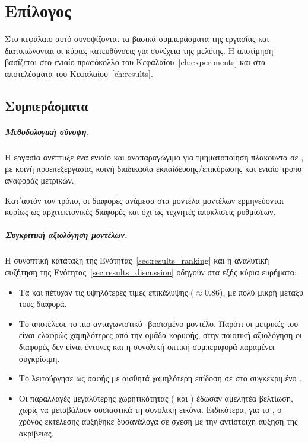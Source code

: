 \chapter{Επίλογος}
\label{ch:conclusion}

Στο κεφάλαιο αυτό συνοψίζονται τα βασικά συμπεράσματα της εργασίας και
διατυπώνονται οι κύριες κατευθύνσεις για συνέχεια της μελέτης. Η αποτίμηση
βασίζεται στο ενιαίο πρωτόκολλο του Κεφαλαίου~\ref{ch:experiments} και στα
αποτελέσματα του Κεφαλαίου~\ref{ch:results}.

\section{Συμπεράσματα}

\paragraph{Μεθοδολογική σύνοψη.}
Η εργασία ανέπτυξε ένα ενιαίο και αναπαραγώγιμο  για
τμηματοποίηση πλακούντα σε , με κοινή προεπεξεργασία, κοινή
διαδικασία εκπαίδευσης/επικύρωσης και ενιαίο τρόπο αναφοράς μετρικών.

Κατ$'$αυτόν τον τρόπο, οι διαφορές ανάμεσα στα μοντέλα μοντέλων ερμηνεύονται κυρίως ως
αρχιτεκτονικές διαφορές και όχι ως τεχνητές αποκλίσεις ρυθμίσεων.

\paragraph{Συγκριτική αξιολόγηση μοντέλων.}
Η συνοπτική κατάταξη της Ενότητας~\ref{sec:results_ranking} και η αναλυτική
συζήτηση της Ενότητας~\ref{sec:results_discussion} οδηγούν στα εξής κύρια ευρήματα:
\begin{itemize}
  \item Τα  και  πέτυχαν τις υψηλότερες τιμές
  επικάλυψης ($\approx 0.86$), με πολύ μικρή μεταξύ τους διαφορά.
  \item Το  αποτέλεσε το πιο ανταγωνιστικό
  -βασισμένο μοντέλο. Παρότι οι μετρικές του είναι ελαφρώς
  χαμηλότερες από την ομάδα κορυφής, στην ποιοτική αξιολόγηση οι διαφορές δεν
  είναι έντονες και η συνολική οπτική συμπεριφορά παραμένει συγκρίσιμη.
  \item Το  λειτούργησε ως σαφής  με αισθητά χαμηλότερη
  επίδοση σε  στο συγκεκριμένο .
  \item Οι παραλλαγές μεγαλύτερης χωρητικότητας 
  ( και ) έδωσαν αμελητέα βελτίωση, 
  χωρίς να μεταβάλουν ουσιαστικά τη συνολική εικόνα. Ειδικότερα, για  
  το , ο χρόνος εκτέλεσης αυξήθηκε δυσανάλογα σε 
  σχέση με την αντίστοιχη αύξηση της ακρίβειας.
\end{itemize}

